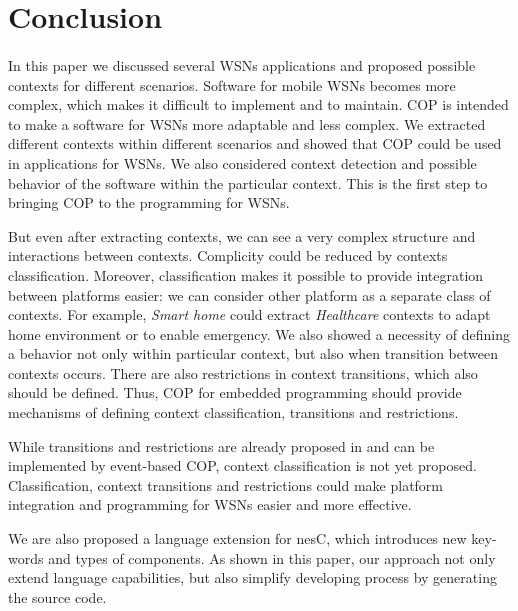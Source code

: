 \documentclass[12pt,a4paper]{article}
\begin{document}
\section{Conclusion}
\paragraph{}
In this paper we discussed several WSNs applications and proposed possible contexts for different scenarios. Software for mobile WSNs becomes more complex, which makes it difficult to implement and to maintain. COP is intended to make a software  for WSNs more adaptable and less complex. We extracted different contexts within different scenarios and showed that COP could be used in applications for WSNs. We also considered context detection and possible behavior of the software within the particular context. This is  the first step to bringing COP to the programming for WSNs.

But even after extracting contexts, we can see a very complex structure and interactions between contexts. Complicity could be reduced by contexts classification. Moreover, classification makes it possible to provide integration between platforms easier: we can consider other platform as a separate class of contexts. For example, \textit{Smart home} could extract \textit{Healthcare} contexts to adapt home environment or to enable emergency. We also showed a necessity of defining a behavior not only within particular context, but also when transition between contexts occurs. There are also restrictions in context transitions, which also should be defined. Thus, COP for embedded programming should provide mechanisms of defining context classification, transitions and restrictions.

While transitions and restrictions are already proposed in \cite{kamina10} and can be implemented by event-based COP, context classification is not yet proposed. Classification, context transitions and restrictions could make platform integration and programming for WSNs easier and more effective.

We are also proposed a language extension for nesC, which introduces new key-words and types of components. As shown in this paper, our approach not only extend language capabilities, but also simplify developing process by generating the source code. 
\end{document}
